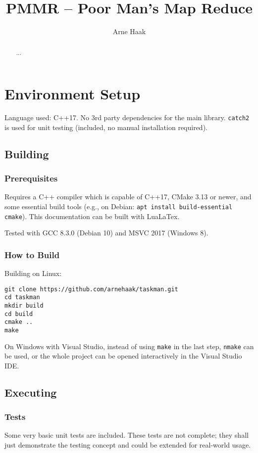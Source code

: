 \documentclass[a4paper]{scrartcl}
\title{PMMR -- Poor Man's Map Reduce}
\author{Arne Haak}
\begin{document}
\maketitle

\begin{abstract}
...
\end{abstract}

\tableofcontents
\newpage

\section{Environment Setup}

Language used: C++17. No 3rd party dependencies for the main library. \texttt{catch2} is used for unit testing (included, no manual installation required).

\subsection{Building}

\subsubsection{Prerequisites}
Requires a C++ compiler which is capable of C++17, CMake 3.13 or newer, and some essential build tools (e.g., on Debian: \texttt{apt install build-essential cmake}).
This documentation can be built with LuaLaTex.

Tested with GCC 8.3.0 (Debian 10) and MSVC 2017 (Windows 8).

\subsubsection{How to Build}
Building on Linux:
\begin{verbatim}
git clone https://github.com/arnehaak/taskman.git
cd taskman
mkdir build
cd build
cmake ..
make
\end{verbatim}

On Windows with Visual Studio, instead of using \texttt{make} in the last step, \texttt{nmake} can be used, or the whole project can be opened interactively in the Visual Studio IDE.

\subsection{Executing}

\subsubsection{Tests}
Some very basic unit tests are included. These tests are not complete; they shall just demonstrate the testing concept and could be extended for real-world usage.
\end{document}
